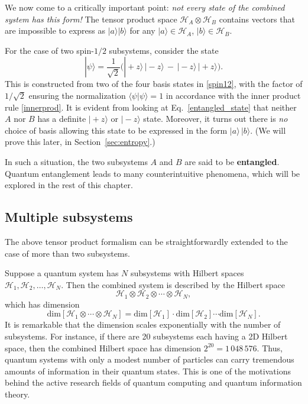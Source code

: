 \documentclass[pra,12pt]{revtex4}
\begin{document}
We now come to a critically important point: \textit{not every state
  of the combined system has this form!}  The tensor product space
$\mathscr{H}_A\otimes \mathscr{H}_B$ contains vectors that are
impossible to express as $|a\rangle |b\rangle$ for any $|a\rangle \in
\mathscr{H}_A$, $|b\rangle \in \mathscr{H}_B$.

For the case of two spin-$1/2$ subsystems, consider the state
\begin{equation}
  |\psi\rangle = \frac{1}{\sqrt{2}} \Big(|\!+\!z\rangle\,|\!-\!z\rangle \,-\, |\!-\!z\rangle\,|\!+\!z\rangle\Big).
  \label{entangled_state}
\end{equation}
This is constructed from two of the four basis states in
\eqref{spin12}, with the factor of $1/\sqrt{2}$ ensuring the
normalization $\langle\psi|\psi\rangle = 1$ in accordance with the
inner product rule \eqref{innerprod}.  It is evident from looking at
Eq.~\eqref{entangled_state} that neither $A$ nor $B$ has a definite
$|\!+\!z\rangle$ or $|\!-\!z\rangle$ state.  Moreover, it turns out
there is \textit{no} choice of basis allowing this state to be
expressed in the form $|a\rangle\, |b\rangle$.  (We will prove this
later, in Section~\ref{sec:entropy}.)

In such a situation, the two subsystems $A$ and $B$ are said to be
\textbf{entangled}.  Quantum entanglement leads to many
counterintuitive phenomena, which will be explored in the rest of this
chapter.

\subsection{Multiple subsystems}

The above tensor product formalism can be straightforwardly extended
to the case of more than two subsystems.

Suppose a quantum system has $N$ subsystems with Hilbert spaces
$\mathscr{H}_1, \mathscr{H}_2, \dots, \mathscr{H}_N$.  Then the
combined system is described by the Hilbert space
\begin{equation}
  \mathscr{H}_1 \otimes \mathscr{H}_2 \otimes \cdots \otimes
  \mathscr{H}_N,
\end{equation}
which has dimension
\begin{equation}
  \mathrm{dim}\left[\mathscr{H}_1 \otimes \cdots \otimes \mathscr{H}_N\right]
  = \mathrm{dim}\left[\mathscr{H}_1\right] \cdot
  \mathrm{dim}\left[\mathscr{H}_2\right] \cdots
  \mathrm{dim}\left[\mathscr{H}_N\right].
\end{equation}
It is remarkable that the dimension scales exponentially with the
number of subsystems.  For instance, if there are 20 subsystems each
having a 2D Hilbert space, then the combined Hilbert space has
dimension $2^{20} =1\,048\,576$.  Thus, quantum systems with only a
modest number of particles can carry tremendous amounts of information
in their quantum states.  This is one of the motivations behind the
active research fields of quantum computing and quantum information
theory.
\end{document}
